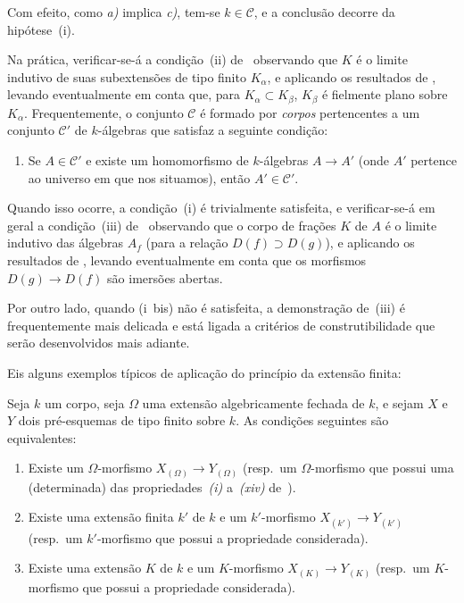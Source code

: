 Com efeito, como \emph{a)} implica \emph{c)}, tem-se $k\in\mathcal{C}$, e a conclusão decorre da hipótese~(i).

\begin{remark}[9.1.3]
\label{IV.9.1.3}
Na prática, verificar-se-á a condição~(ii) de~ observando que $K$ é o limite indutivo de suas subextensões de tipo finito $K_\alpha$, e aplicando os resultados de , levando eventualmente em conta que, para $K_\alpha\subset K_\beta$, $K_\beta$ é fielmente plano sobre $K_\alpha$.
Frequentemente, o conjunto $\mathcal{C}$ é formado por \emph{corpos} pertencentes a um conjunto $\mathcal{C}'$ de $k$-álgebras que satisfaz a seguinte condição:
\begin{enumerate}[label=(\roman*~bis)]
  \item Se $A\in\mathcal{C}'$ e existe um homomorfismo de $k$-álgebras $A\to A'$ (onde $A'$ pertence ao universo em que nos situamos), então $A'\in\mathcal{C}'$.
\end{enumerate}

Quando isso ocorre, a condição~(i) é trivialmente satisfeita, e verificar-se-á em geral a condição~(iii) de~ observando que o corpo de frações $K$ de $A$ é o limite indutivo das álgebras $A_f$ (para a relação $D(f)\supset D(g)$), e aplicando os resultados de , levando eventualmente em conta que os morfismos $D(g)\to D(f)$ são imersões abertas.

Por outro lado, quando (i~bis) não é satisfeita, a demonstração de~(iii) é frequentemente mais delicada e está ligada a critérios de construtibilidade que serão desenvolvidos mais adiante.
\end{remark}

Eis alguns exemplos típicos de aplicação do princípio da extensão finita:

\begin{proposition}[9.1.4]
\label{IV.9.1.4}
Seja $k$ um corpo, seja $\Omega$ uma extensão algebricamente fechada de $k$, e sejam $X$ e $Y$ dois pré-esquemas de tipo finito sobre $k$.
As condições seguintes são equivalentes:
\begin{enumerate}[label=\emph{\alph*)}]
  \item Existe um $\Omega$-morfismo $X_{(\Omega)}\to Y_{(\Omega)}$ \textnormal{(}resp.\ um $\Omega$-morfismo que possui uma (determinada) das propriedades~\emph{(i)} a~\emph{(xiv)} de~\textnormal{)}.
  \item Existe uma extensão finita $k'$ de $k$ e um $k'$-morfismo $X_{(k')}\to Y_{(k')}$ \textnormal{(}resp.\ um $k'$-morfismo que possui a propriedade considerada\textnormal{)}.
  \item Existe uma extensão $K$ de $k$ e um $K$-morfismo $X_{(K)}\to Y_{(K)}$ \textnormal{(}resp.\ um $K$-morfismo que possui a propriedade considerada\textnormal{)}.
\end{enumerate}
\end{proposition}

